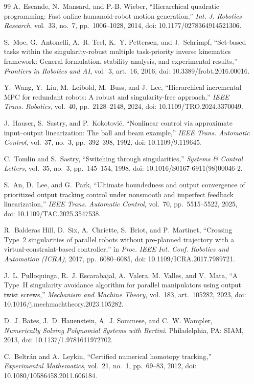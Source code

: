 \documentclass[11pt,american]{article}
\theoremstyle{definition}
\theoremstyle{plain}
\theoremstyle{remark}
\begin{document}
\begin{thebibliography}{99}
 A.~Escande, N.~Mansard, and P.-B. Wieber, ``Hierarchical quadratic programming: Fast online humanoid-robot motion generation,'' \emph{Int. J. Robotics Research}, vol.~33, no.~7, pp.~1006--1028, 2014, doi: 10.1177/0278364914521306.

 S.~Moe, G.~Antonelli, A.~R. Teel, K.~Y. Pettersen, and J.~Schrimpf, ``Set-based tasks within the singularity-robust multiple task-priority inverse kinematics framework: General formulation, stability analysis, and experimental results,'' \emph{Frontiers in Robotics and AI}, vol.~3, art.~16, 2016, doi: 10.3389/frobt.2016.00016.

 Y.~Wang, Y.~Liu, M.~Leibold, M.~Buss, and J.~Lee, ``Hierarchical incremental MPC for redundant robots: A robust and singularity-free approach,'' \emph{IEEE Trans. Robotics}, vol.~40, pp.~2128--2148, 2024, doi: 10.1109/TRO.2024.3370049.

 J.~Hauser, S.~Sastry, and P.~Kokotovi\'c, ``Nonlinear control via approximate input--output linearization: The ball and beam example,'' \emph{IEEE Trans. Automatic Control}, vol.~37, no.~3, pp.~392--398, 1992, doi: 10.1109/9.119645.

 C.~Tomlin and S.~Sastry, ``Switching through singularities,'' \emph{Systems \& Control Letters}, vol.~35, no.~3, pp.~145--154, 1998, doi: 10.1016/S0167-6911(98)00046-2.

 S.~An, D.~Lee, and G.~Park, ``Ultimate boundedness and output convergence of prioritized output tracking control under nonsmooth and imperfect feedback linearization,'' \emph{IEEE Trans. Automatic Control}, vol.~70, pp.~5515--5522, 2025, doi: 10.1109/TAC.2025.3547538.

 R.~Balderas Hill, D.~Six, A.~Chriette, S.~Briot, and P.~Martinet, ``Crossing Type~2 singularities of parallel robots without pre-planned trajectory with a virtual-constraint-based controller,'' in \emph{Proc. IEEE Int. Conf. Robotics and Automation (ICRA)}, 2017, pp.~6080--6085, doi: 10.1109/ICRA.2017.7989721.

 J.~L. Pulloquinga, R.~J. Escarabajal, A.~Valera, M.~Valles, and V.~Mata, ``A Type~II singularity avoidance algorithm for parallel manipulators using output twist screws,'' \emph{Mechanism and Machine Theory}, vol.~183, art.~105282, 2023, doi: 10.1016/j.mechmachtheory.2023.105282.

 D.~J. Bates, J.~D. Hauenstein, A.~J. Sommese, and C.~W. Wampler, \emph{Numerically Solving Polynomial Systems with Bertini}. Philadelphia, PA: SIAM, 2013, doi: 10.1137/1.9781611972702.

 C.~Beltr\'an and A.~Leykin, ``Certified numerical homotopy tracking,'' \emph{Experimental Mathematics}, vol.~21, no.~1, pp.~69--83, 2012, doi: 10.1080/10586458.2011.606184.

\end{thebibliography}
\end{document}
